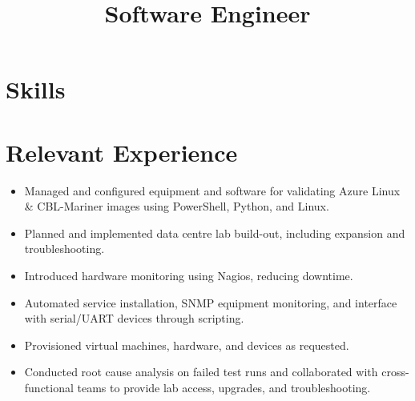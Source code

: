 \documentclass[11pt,sans]{moderncv}
\title{Software Engineer}
\begin{document}
\maketitle
\section{Skills}
\section{Relevant Experience}
\newline{}
\begin{itemize}
\item Managed and configured equipment and software for validating Azure Linux \& CBL-Mariner images using PowerShell, Python, and Linux.
\item Planned and implemented data centre lab build-out, including expansion and troubleshooting.
\item Introduced hardware monitoring using Nagios, reducing downtime.
\item Automated service installation, SNMP equipment monitoring, and interface with serial/UART devices through scripting.
\item Provisioned virtual machines, hardware, and devices as requested.
\item Conducted root cause analysis on failed test runs and collaborated with cross-functional teams to provide lab access, upgrades, and troubleshooting.\newline{}
\end{itemize}
\newline{}
\end{document}
